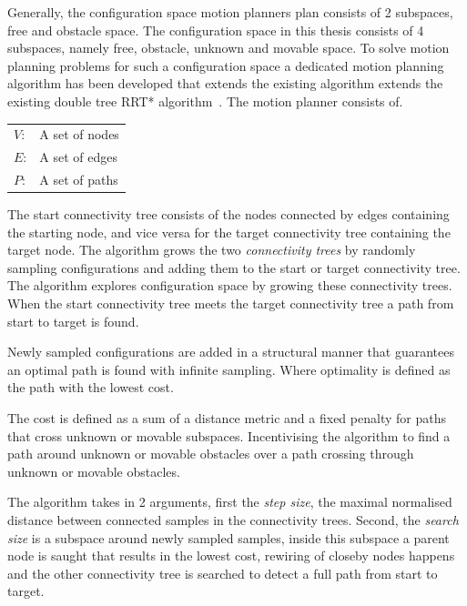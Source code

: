 \textit{}\bs

Generally, the configuration space motion planners plan consists of 2 subspaces, free and obstacle space. The configuration space in this thesis consists of 4 subspaces, namely free, obstacle, unknown and movable space. To solve motion planning problems for such a configuration space a dedicated motion planning algorithm has been developed that extends the existing algorithm extends the existing double tree \ac{RRT*} algorithm~\cite{chen_fast_2018}. The motion planner consists of.
\begin{center}
\begin{tabular}[t]{l p{10cm}}
$V$:& A set of nodes\\
$E$:& A set of edges\\
$P$:& A set of paths\\
\end{tabular}
\end{center}

The start connectivity tree consists of the nodes connected by edges containing the starting node, and vice versa for the target connectivity tree containing the target node. The algorithm grows the two \textit{connectivity trees} by randomly sampling configurations and adding them to the start or target connectivity tree. The algorithm explores configuration space by growing these connectivity trees. When the start connectivity tree meets the target connectivity tree a path from start to target is found.\bs

Newly sampled configurations are added in a structural manner that guarantees an optimal path is found with infinite sampling. Where optimality is defined as the path with the lowest cost.


The cost is defined as a sum of a distance metric and a fixed penalty for paths that cross unknown or movable subspaces. Incentivising the algorithm to find a path around unknown or movable obstacles over a path crossing through unknown or movable obstacles.\bs

The algorithm takes in 2 arguments, first the \textit{step size}, the maximal normalised distance between connected samples in the connectivity trees. Second, the \textit{search size} is a subspace around newly sampled samples, inside this subspace a parent node is saught that results in the lowest cost, rewiring of closeby nodes happens and the other connectivity tree is searched to detect a full path from start to target.\bs

